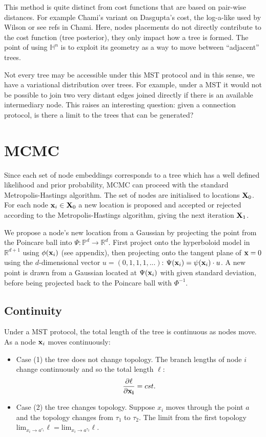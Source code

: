 \documentclass[11pt]{article}
\newcommand{\be}{\begin{equation*}}
\newcommand{\ee}{\end{equation*}}
\begin{document}
This method is quite distinct from cost functions that are based on pair-wise distances. For example Chami's variant on Dasgupta's cost, the log-a-like used by Wilson or see refs in Chami. Here, nodes placements do not directly contribute to the cost function (tree posterior), they only impact how a tree is formed. The point of using $\mathbb{H}^{n}$ is to exploit its geometry as a way to move between ``adjacent'' trees.

Not every tree may be accessible under this MST protocol and in this sense, we have a variational distribution over trees.
For example, under a MST it would not be possible to join two very distant edges joined directly if there is an available intermediary node.
This raises an interesting question: given a connection protocol, is there a limit to the trees that can be generated?

\section{MCMC}
Since each set of node embeddings corresponds to a tree which has a well defined likelihood and prior probability, MCMC can proceed with the standard Metropolis-Hastings algorithm.
The set of nodes are initialised to locations $\bold{X}_{0}$.
For each node $\bold{x}_{i} \in \bold{X}_{0}$ a new location is proposed and accepted or rejected according to the Metropolis-Hastings algorithm, giving the next iteration $\bold{X}_{1}$.

We propose a node's new location from a Gaussian by projecting the point from the Poincare ball into $\Psi: \mathbb{P}^{d} \to \mathbb{R}^{d}$.
First project onto the hyperboloid model in $\mathbb{R}^{d+1}$ using $\phi(\bold{x}_{i})$ (see appendix), then projecting onto the tangent plane of $\bold{x}=0$ using the $d$-dimensional vector $u=(0, 1, 1, 1,...)$: $\Psi(\bold{x}_{i}) = \psi(\bold{x}_{i}) \cdot u $.
A new point is drawn from a Gaussian located at $\Psi(\bold{x}_{i})$ with given standard deviation, before being projected back to the Poincare ball with $\Phi^{-1}$.

\subsection{Continuity}
Under a MST protocol, the total length of the tree is continuous as nodes move.
As a node $\bold{x}_{i}$ moves continuously:
\begin{itemize}
\item Case (1) the tree does not change topology. The branch lengths of node $i$ change continuously and so the total length $\ell$:
\be
\dfrac{\partial \ell}{\partial \bold{x_{i}}} = cst.
\ee
\item Case (2) the tree changes topology. Suppose $x_{i}$ moves through the point $a$ and the topology changes from $\tau_{1}$ to $\tau_{2}$. The limit from the first topology $\text{lim}_{x_{i} \to a^{\tau_{1}}} \ell = \text{lim}_{x_{i} \to a^{\tau_{2}}} \ell$.
\end{itemize}
\end{document}
